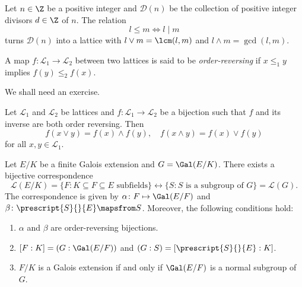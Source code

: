 \begin{example}
    Let $n \in \Z$ be a positive integer and $\mathcal{D}(n)$ be the collection of positive integer divisors $d \in \Z$ of $n$. The relation
    \[
    l \leq m \Longleftrightarrow l \mid m
    \]
    turns $\mathcal{D}(n)$ into a lattice with
    $l \vee m = \lcm(l,m)$ and $l \wedge m = \gcd(l,m)$.
\end{example}

A map $f\colon \mathcal{L}_1\to \mathcal{L}_2$ between two lattices is 
said to be \emph{order-reversing} if 
$x\leq_1 y$ implies $f(y)\leq_2 f(x)$. 

We shall need an exercise. 

\begin{exercise}
\label{xca:order_reversing}
    Let $\mathcal{L}_1$ and $\mathcal{L}_2$ be lattices and $f\colon \mathcal{L}_1\to \mathcal{L}_2$ be a bijection 
    such that $f$ and its inverse are both order reversing. Then 
    \[
    f(x\vee y)=f(x)\wedge f(y),\quad 
    f(x\wedge y)=f(x)\vee f(y)
    \]
    for all $x,y\in \mathcal{L}_1$. 
\end{exercise}



\begin{theorem}[Galois]
    Let $E/K$ be a finite Galois extension and $G=\Gal(E/K)$. 
    There exists a bijective correspondence
    \[
    \mathcal{L}(E/K)=\{F:K\subseteq F\subseteq E\text{ subfields}\}\leftrightarrow
    \{S:S\text{ is a subgroup of $G$}\}=\mathcal{L}(G). 
    \]
    The correspondence is given by $\alpha\colon F\mapsto \Gal(E/F)$ and 
    $\beta\colon \prescript{S}{}{E}\mapsfrom S$. Moreover, the following
    conditions hold:
    \begin{enumerate}
        \item $\alpha$ and $\beta$ are order-reversing bijections. 
        \item $[F:K]=(G:\Gal(E/F))$ and $(G:S)=[\prescript{S}{}{E}:K]$.
        \item $F/K$ is a Galois extension if and only if $\Gal(E/F)$ is a normal subgroup of $G$.        
    \end{enumerate}
\end{theorem}

